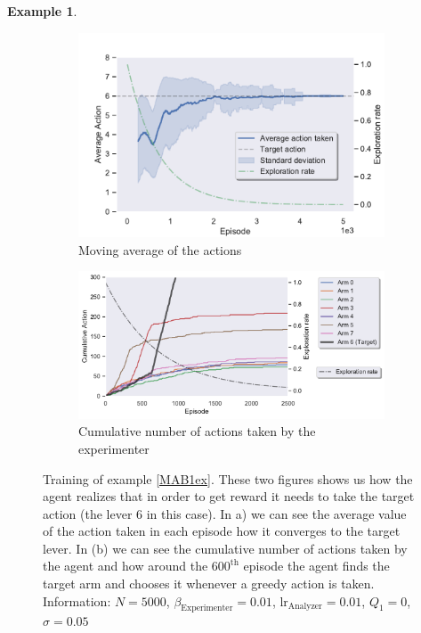 \documentclass[11pt,a4paper,twoside]{report}
\newcommand{\+}{\textnormal{+} }
\theoremstyle{definition}
\newtheorem{myex}[mythm]{Example}
\numberwithin{equation}{chapter}
\begin{document}
\begin{myex}
    \begin{figure}[]
      \centering
      \begin{subfigure}{.5\textwidth}
        \centering
        \includegraphics[width=1\linewidth]{figures/Actions-MAB1.pdf}
        \caption{Moving average of the actions}
        \label{fig:ActionAverageMAB1}
      \end{subfigure}%
      \begin{subfigure}{.5\textwidth}
        \centering
        \includegraphics[width=1\linewidth]{figures/Cum-action-MAB1.pdf}
        \caption{Cumulative number of actions taken by the experimenter}
        \label{fig:actionsMAB1}
      \end{subfigure}
      \caption{Training of example \ref{MAB1ex}. These two figures shows us how
      the agent realizes that in order to get reward it needs to take the target
      action (the lever 6 in this case). In a) we can see the average value of
      the action taken in each episode how it converges to the target lever.
      In (b) we can see the cumulative number of actions taken by the agent and
      how around the $600^\text{th}$ episode the agent finds the target arm and
      chooses it whenever a greedy action is taken. Information: $N=5000$,
      $\beta_\text{Experimenter}=0.01$, $\text{lr}_\text{Analyzer}=0.01$,
      $Q_1=0$, $\sigma=0.05$}
    \end{figure}  




\end{myex}
\end{document}
